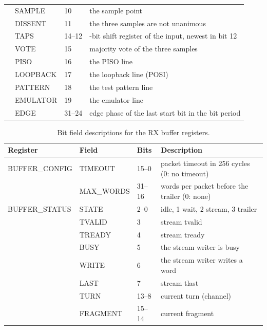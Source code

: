 \documentclass[12pt]{article}
\begin{document}
\begin{table}
\begin{center}
\begin{tabular}{lll>{\raggedright\arraybackslash}p{7.7cm}}
               & SAMPLE  & 10     & the sample point \\
               & DISSENT & 11     & the three samples are not unanimous \\
               & TAPS    & 14--12 & 3-bit shift register of the input, newest in bit 12 \\
               & VOTE    & 15     & majority vote of the three samples \\
               & PISO    & 16     & the PISO line \\
               & LOOPBACK & 17    & the loopback line (POSI) \\
               & PATTERN & 18     & the test pattern line \\
               & EMULATOR & 19    & the emulator line \\
               & EDGE    & 31--24 & edge phase of the last start bit in the bit period \\
\end{tabular}
\end{center}
\end{table}

\begin{table}[htbp]
\caption{\label{tbl:rx-buffer-bit-fields} Bit field descriptions for the RX buffer registers.}
\begin{center}
\begin{tabular}{lll>{\raggedright\arraybackslash}p{7.7cm}}
Register       & Field   & Bits   & Description \\
\hline
BUFFER\_CONFIG & TIMEOUT & 15--0  & packet timeout in 256 cycles (0: no timeout)\\
               & MAX\_WORDS & 31--16 & words per packet before the trailer (0: none) \\
\hline
BUFFER\_STATUS & STATE   & 2--0   & 0 idle, 1 wait, 2 stream, 3 trailer \\
               & TVALID  & 3      & stream tvalid \\
               & TREADY  & 4      & stream tready \\
               & BUSY    & 5      & the stream writer is busy \\
               & WRITE   & 6      & the stream writer writes a word \\
               & LAST    & 7      & stream tlast \\
               & TURN    & 13--8  & current turn (channel) \\
               & FRAGMENT & 15--14 & current fragment \\
\end{tabular}
\end{center}
\end{table}
\end{document}
